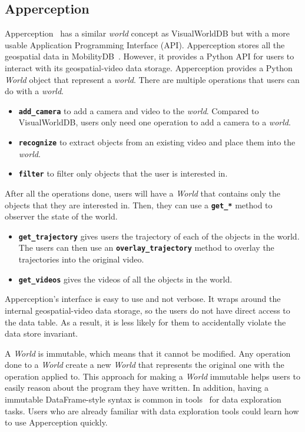\subsection{Apperception}
Apperception~\cite{ge:apperception} has a similar \emph{world} concept as VisualWorldDB but with a more usable Application Programming Interface (API).
Apperception stores all the geospatial data in MobilityDB~\cite{zimanyi:mobility}. However, it provides a Python API for users to interact with its geospatial-video data storage.
Apperception provides a Python \emph{World} object that represent a \emph{world}.
There are multiple operations that users can do with a \emph{world}.
\begin{itemize}
    \item
    \textbf{\texttt{add\_camera}} to add a camera and video to the \emph{world}.
    Compared to VisualWorldDB, users only need one operation to add a camera to a \emph{world}.
    \item
    \textbf{\texttt{recognize}} to extract objects from an existing video and place them into the \emph{world}.
    \item
    \textbf{\texttt{filter}} to filter only objects that the user is interested in.
\end{itemize}
After all the operations done, users will have a \emph{World} that contains only the objects that they are interested in.
Then, they can use a \textbf{\texttt{get\_*}} method to observer the state of the world.
\begin{itemize}
    \item
    \textbf{\texttt{get\_trajectory}} gives users the trajectory of each of the objects in the world.
    The users can then use an \textbf{\texttt{overlay\_trajectory}} method to overlay the trajectories into the original video.
    \item
    \textbf{\texttt{get\_videos}} gives the videos of all the objects in the world.
\end{itemize}

Apperception's interface is easy to use and not verbose.
It wraps around the internal geospatial-video data storage,
so the users do not have direct access to the data table.
As a result, it is less likely for them to accidentally violate the data store invariant.

A \emph{World} is immutable, which means that it cannot be modified.
Any operation done to a \emph{World} create a new \emph{World} that represents the original one with the operation applied to.
This approach for making a \emph{World} immutable helps users to easily reason about the program they have written.
In addition, having a immutable DataFrame-style syntax is common in tools~\cite{wickham:dplyr, pandas, mckinney:pandas} for data exploration tasks.
Users who are already familiar with data exploration tools could learn how to use Apperception quickly.

